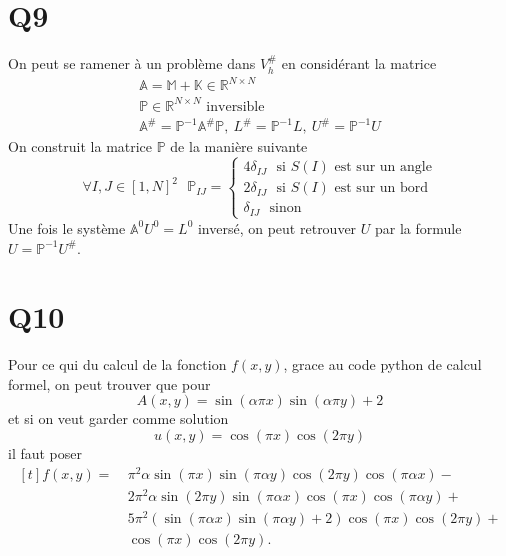 \documentclass[11pt]{article}
\newcommand{\Am}{\mathbb{A}}
\renewcommand{\P}{\mathbb{P}}
\newcommand{\R}{\mathbb{R}}
\newcommand{\K}{\mathbb{K}}
\newcommand{\M}{\mathbb{M}}
\newcommand{\ms}{~~~}
\begin{document}
\section{Q9}

On peut se ramener à un problème dans $V^{\#}_h$ en considérant la matrice
\begin{gather}
  \Am = \M + \K \in \R^{N\times N } \\
  \P \in \R^{N\times N} \mbox{~inversible}\\
  \Am^{\#} = \P^{-1}\Am^{\#}\P, ~ L^{\#} = \P^{-1} L, ~ U^{\#} = \P^{-1} U 
\end{gather} 
On construit la matrice $\P$ de la manière suivante
\begin{equation}
  \forall I,J \in [1,N]^2 \ms
  \P_{IJ} =
  \begin{cases}
    4 \delta_{IJ} \ms \mbox{si~} S(I) \mbox{~est sur un angle} \\
    2 \delta_{IJ} \ms \mbox{si~} S(I) \mbox{~est sur un bord} \\
    \delta_{IJ} \ms \mbox{sinon}
  \end{cases}
\end{equation}
Une fois le système $\Am^0 U^0 = L^0$ inversé, on peut retrouver $U$ par la formule $U=\P^{-1} U^{\#}$.

\section{Q10}

Pour ce qui du calcul de la fonction $f(x,y)$, grace au code python de calcul formel, on peut trouver que pour
\begin{equation}
  A(x,y)= \sin(\alpha \pi x)\sin(\alpha \pi y) + 2
\end{equation}
et si on veut garder comme solution
\begin{equation}
  u(x,y)=\cos(\pi x)\cos(2\pi y)
\end{equation}
il faut poser
\begin{equation}
  \begin{aligned}[t]
    f(x,y) =~& \pi^2 \alpha \sin(\pi x)  \sin(\pi \alpha y)  \cos(2 \pi y)  \cos(\pi \alpha x) - \\
          &2 \pi^2 \alpha \sin(2 \pi y)  \sin(\pi \alpha x)  \cos(\pi x)  \cos(\pi \alpha y) + \\
          &5 \pi^2 (\sin(\pi \alpha x)  \sin(\pi \alpha y) + 2)  \cos(\pi x)  \cos(2 \pi y) + \\
          &\cos(\pi x)  \cos(2 \pi y).
  \end{aligned}
\end{equation}
\end{document}
